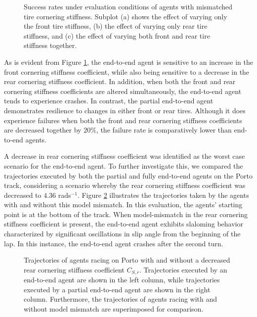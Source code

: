 \begin{figure}[htb!]
    \centering
    
    \caption[Success rate of agents under evaluation conditions with mismatched tire cornering stiffness]{Success rates under evaluation conditions of agents with mismatched tire cornering stiffness. Subplot (a) shows the effect of varying only the front tire stiffness, (b) the effect of varying only rear tire stiffness, and (c) the effect of varying both front and rear tire stiffness together.}
    \label{fig:c_s}
\end{figure}

As is evident from Figure \ref{fig:c_s}, the end-to-end agent is sensitive to an increase in the front cornering stiffness coefficient, while also being sensitive to a decrease in the rear cornering stiffness coefficient.
In addition, when both the front and rear cornering stiffness coefficients are altered simultaneously, the end-to-end agent tends to experience crashes. 
In contrast, the partial end-to-end agent demonstrates resilience to changes in either front or rear tires.
Although it does experience failures when both the front and rear cornering stiffness coefficients are decreased together by $20\%$, the failure rate is comparatively lower than end-to-end agents.


A decrease in rear cornering stiffness coefficient was identified as the worst case scenario for the end-to-end agent.
To further investigate this, we compared the trajectories executed by both the partial and fully end-to-end agents on the Porto track, considering a scenario whereby the rear cornering stiffness coefficient was decreased to $4.36$ rads$^{-1}$. 
Figure \ref{fig:c_sr} illustrates the trajectories taken by the agents with and without this model mismatch. 
In this evaluation, the agents' starting point is at the bottom of the track. 
When model-mismatch in the rear cornering stiffness coefficient is present, the end-to-end agent exhibits slaloming behavior characterized by significant oscillations in slip angle from the beginning of the lap.
In this instance, the end-to-end agent crashes after the second turn. 


\begin{figure}[htb!]
    \centering
    
    \caption[Trajectories of agents racing with and without a decreased rear cornering stiffness coefficient]{Trajectories of agents racing on Porto with and without a decreased rear cornering stiffness coefficient $C_{S,r}$. Trajectories executed by an end-to-end agent are shown in the left column, while trajectories executed by a partial end-to-end agent are shown in the right column. Furthermore, the trajectories of agents racing with and without model mismatch are superimposed for comparison.}
    \label{fig:c_sr}
\end{figure}

